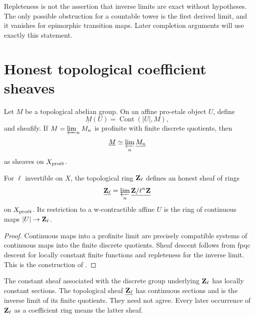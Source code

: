 \begin{remark}
Repleteness is not the assertion that inverse limits are exact without
hypotheses.  The only possible obstruction for a countable tower is the
first derived limit, and it vanishes for epimorphic transition maps.  Later
completion arguments will use exactly this statement.
\end{remark}

\section{Honest topological coefficient sheaves}

\begin{definition}
Let \(M\) be a topological abelian group.  On an affine pro-etale object
\(U\), define
\[
  \underline M(U)=\operatorname{Cont}(|U|,M),
\]
and sheafify.  If \(M=\varprojlim_n M_n\) is profinite with finite discrete
quotients, then
\[
  \underline M \simeq \varprojlim_n \underline{M_n}
\]
as sheaves on \(X_{\mathrm{pro\acute et}}\).
\end{definition}

\begin{proposition}
\label{prop:proetale-zl-sheaf}
For \(\ell\) invertible on \(X\), the topological ring \(\mathbf Z_\ell\) defines an
honest sheaf of rings
\[
  \underline{\mathbf Z_\ell}
     =\varprojlim_n \underline{\mathbf Z/\ell^n\mathbf Z}
\]
on \(X_{\mathrm{pro\acute et}}\).  Its restriction to a w-contractible affine \(U\) is the
ring of continuous maps \(|U|\to\mathbf Z_\ell\).
\end{proposition}

\begin{proof}
Continuous maps into a profinite limit are precisely compatible systems of
continuous maps into the finite discrete quotients.  Sheaf descent follows
from fpqc descent for locally constant finite functions and repleteness for
the inverse limit.  This is the construction of
\cite[Lemma~4.2.12]{BhattScholzeProEtale}.
\end{proof}

\begin{warning}
The constant sheaf associated with the discrete group underlying \(\mathbf Z_\ell\)
has locally constant sections.  The topological sheaf \(\underline{\mathbf Z_\ell}\)
has continuous sections and is the inverse limit of its finite quotients.
They need not agree.  Every later occurrence of \(\mathbf Z_\ell\) as a coefficient
ring means the latter sheaf.
\end{warning}

